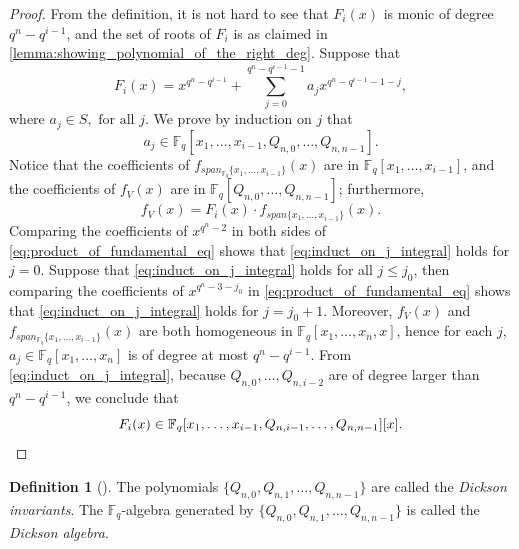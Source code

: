 \documentclass[12pt,a4paper]{report}
\theoremstyle{definition}
\newtheorem{definition}[theorem]{Definition}
\theoremstyle{remark}
\theoremstyle{definition}
\begin{document}
    \begin{proof}
        From the definition, it is not hard to see that $F_i(x)$ is monic of degree $q^n-q^{i-1}$, and the set of roots of $F_i$ is as claimed in \cref{lemma:showing_polynomial_of_the_right_deg}. Suppose that
        \begin{equation*}
            F_i(x) = x^{q^{n}-q^{i-1}} + \sum\limits_{j=0}^{q^n - q^{i-1}-1}a_j x^{q^n - q^{i-1}-1-j},
        \end{equation*}
        where $a_j\in S, \text{ for all } j$. We prove by induction on $j$ that 
        \begin{equation}\label{eq:induct_on_j_integral}
        a_j\in \mathbb{F}_q[x_1, \ldots, x_{i-1}, Q_{n, 0}, \ldots, Q_{n, n-1}].    
        \end{equation}
        Notice that the coefficients of $f_{span_{\mathbb{F}_q}\{x_1, \ldots, x_{i-1}\}}(x)$ are in $\mathbb{F}_q[x_1, \ldots, x_{i-1}]$, and the coefficients of $f_V(x)$ are in $\mathbb{F}_q[Q_{n, 0}, \ldots, Q_{n, n-1}]$; furthermore, 
        \begin{equation}\label{eq:product_of_fundamental_eq}
        f_V(x) = F_i(x)\cdot f_{span\{x_1, \ldots, x_{i-1}\}}(x).    
        \end{equation}
        Comparing the coefficients of $x^{q^n-2}$ in both sides of \eqref{eq:product_of_fundamental_eq} shows that \eqref{eq:induct_on_j_integral} holds for $j=0$. Suppose that \eqref{eq:induct_on_j_integral} holds for all $j\leq j_0$, then comparing the coefficients of $x^{q^n - 3-j_0}$ in \eqref{eq:product_of_fundamental_eq} shows that \eqref{eq:induct_on_j_integral} holds for $j=j_0+1$. Moreover, $f_V(x)$ and $f_{span_{\mathbb{F}_q}\{x_1, \ldots, x_{i-1}\}}(x)$ are both homogeneous in $\mathbb{F}_q[x_1, \ldots, x_n, x]$, hence for each $j$, $a_j\in \mathbb{F}_q[x_1, \ldots, x_n]$ is of degree at most $q^n - q^{i-1}$. From \eqref{eq:induct_on_j_integral}, because $Q_{n, 0}, \ldots, Q_{n, i-2}$ are of degree larger than $q^n-q^{i-1}$, we conclude that
        \begin{equation*}
            F_i(x)\in \mathbb{F}_q[x_1, \ldots, x_{i-1}, Q_{n, i-1}, \ldots, Q_{n, n-1}][x].\qedhere
        \end{equation*}
    \end{proof}
\begin{definition}[{\cite{dickson_fundamental_1911}}]\label{def:dickson_invariants}
    The polynomials $\{Q_{n, 0}, Q_{n, 1}, \ldots, Q_{n, n-1}\}$ are called the \emph{Dickson invariants}. The $\mathbb{F}_q$-algebra generated by $\{Q_{n, 0}, Q_{n, 1}, \ldots, Q_{n, n-1}\}$ is called the \emph{Dickson algebra}.
\end{definition}
\end{document}
